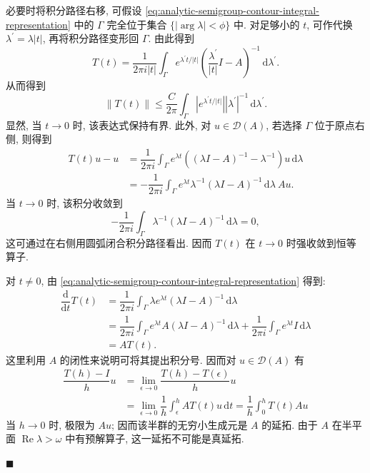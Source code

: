 必要时将积分路径右移, 可假设 \eqref{eq:analytic-semigroup-contour-integral-representation} 中的 $\Gamma$ 完全位于集合 $\{|\arg\lambda|<\phi\}$ 中. 对足够小的 $t$, 可作代换 $\lambda^{\prime}=\lambda|t|$, 再将积分路径变形回 $\Gamma$. 由此得到
\begin{equation}\label{eq:analytic-semigroup-contour-rescaled-at-small-time}
T(t)=\dfrac{1}{2\pi i|t|}\int_\Gamma e^{\lambda^{\prime}t/|t|}\left(\dfrac{\lambda^{\prime}}{|t|}I-A\right)^{-1}\,\mathrm{d}\lambda^{\prime}.
\end{equation}
从而得到
\begin{equation}\label{eq:analytic-semigroup-small-time-contour-norm-bound}
\|T(t)\|\leq\dfrac{C}{2\pi}\int_\Gamma|e^{\lambda^{\prime}t/|t|}||\lambda^{\prime}|^{-1}\,\mathrm{d}\lambda^{\prime}.
\end{equation}
显然, 当 $t\to0$ 时, 该表达式保持有界. 此外, 对 $u\in\mathcal{D}(A)$, 若选择 $\Gamma$ 位于原点右侧, 则得到\[\begin{aligned}
T(t)u-u&=\dfrac{1}{2\pi i}\int_\Gamma e^{\lambda t}((\lambda I-A)^{-1}-\lambda^{-1})u\,\mathrm{d}\lambda\\
&=-\dfrac{1}{2\pi i}\int_\Gamma e^{\lambda t}\lambda^{-1}(\lambda I-A)^{-1}\,\mathrm{d}\lambda\ Au.
\end{aligned}\]当 $t\to0$ 时, 该积分收敛到
\begin{equation}\label{eq:analytic-semigroup-origin-contour-zero-integral}
-\dfrac{1}{2\pi i}\int_\Gamma\lambda^{-1}(\lambda I-A)^{-1}\,\mathrm{d}\lambda=0,
\end{equation}
这可通过在右侧用圆弧闭合积分路径看出. 因而 $T(t)$ 在 $t\to0$ 时强收敛到恒等算子.

\begingroup
\renewenvironment{Proof}{\par}{\par\nobreak\hfill$\blacksquare$\par\vspace{0.1cm}}
\begin{Proof}
对 $t\neq0$, 由 \eqref{eq:analytic-semigroup-contour-integral-representation} 得到:\[\begin{aligned}
\dfrac{\mathrm{d}}{\mathrm{d}t}T(t)&=\dfrac{1}{2\pi i}\int_\Gamma\lambda e^{\lambda t}(\lambda I-A)^{-1}\,\mathrm{d}\lambda\\
&=\dfrac{1}{2\pi i}\int_\Gamma e^{\lambda t}A(\lambda I-A)^{-1}\,\mathrm{d}\lambda+\dfrac{1}{2\pi i}\int_\Gamma e^{\lambda t}I\,\mathrm{d}\lambda\\
&=AT(t).
\end{aligned}\]这里利用 $A$ 的闭性来说明可将其提出积分号. 因而对 $u\in\mathcal{D}(A)$ 有\[\begin{aligned}
\dfrac{T(h)-I}{h}u&=\lim_{\epsilon\to0}\dfrac{T(h)-T(\epsilon)}{h}u\\
&=\lim_{\epsilon\to0}\dfrac{1}{h}\int_\epsilon^h AT(t)u\,\mathrm{d}t=\dfrac{1}{h}\int_0^h T(t)Au
\end{aligned}\]当 $h\to0$ 时, 极限为 $Au$; 因而该半群的无穷小生成元是 $A$ 的延拓. 由于 $A$ 在半平面 $\operatorname{Re}\lambda>\omega$ 中有预解算子, 这一延拓不可能是真延拓.
\end{Proof}
\endgroup

